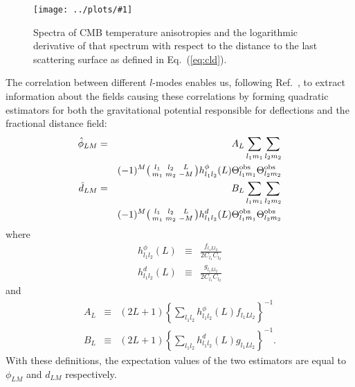 \documentclass[prl,amsmath,amssymb,floatfix,superscriptaddress,nofootinbib,twocolumn]{revtex4-1}
\def\bea{\begin{eqnarray}}
\def\eea{\end{eqnarray}}
\newcommand{\ec}[1]{Eq.~(\ref{eq:#1})}
\newcommand{\eql}[1]{\label{eq:#1}}
\newcommand{\sfig}[2]{
\texttt{[image: ../plots/\#1]}
        }
\newcommand{\Sfig}[2]{
   \begin{figure}[thbp]
   \begin{center}
    \sfig{#1.pdf}{\columnwidth}
    \caption{{\small #2}}
    \label{fig:#1}
     \end{center}
   \end{figure}
}
\newcommand{\scott}[1]{{\color{darkgreen} #1}}
\newcommand{\peikai}[1]{{\color{blue} #1}}
\newcommand{\wh}[1]{{\color{red} #1}}
\begin{document}
\Sfig{TT1}{Spectra of CMB temperature anisotropies and the logarithmic derivative of that spectrum with respect to the distance to the last scattering surface as defined in \ec{cld}.}


The correlation between different $l$-modes enables us, following Ref.~\cite{Okamoto:2003zw}, to extract information about the fields causing these correlations by forming quadratic estimators for both the gravitational potential responsible for deflections and the fractional distance field:
\bea
\hat \phi_{LM} &=& A_L 
\sum_{l_1m_1}\sum_{l_2m_2} \nonumber \\  
&& (-1)^M  \bigl(\begin{smallmatrix} l_1 & l_2 & L \\ m_1 & m_2 & -M  \end{smallmatrix}\bigr) h^{\phi}_{l_1l_2}(L)  \tob_{l_1m_1} \tob_{l_2m_2} \\
\hat d_{LM} &=& B_{L} \sum_{l_1m_1}\sum_{l_2m_2}\nonumber \\
&& (-1)^M  \bigl(\begin{smallmatrix} l_1 & l_2 & L \\ m_1 & m_2 & -M  \end{smallmatrix}\bigr) h^{d}_{l_1l_2}(L)  \tob_{l_1m_1} \tob_{l_2m_2}\eql{distest}
\eea
where
\bea
h^{\phi}_{l_1l_2}(L)&\equiv& \frac{f_{l_1Ll_2}}{2C_{l_1}C_{l_2}} \\
h^{d}_{l_1l_2}(L)&\equiv& \frac{g_{l_1Ll_2}}{2C_{l_1}C_{l_2}}
\eea
and %
\bea
A_L &\equiv& 
(2L+1)
 \left\{ \sum_{l_1l_2} h^{\phi}_{l_1l_2}(L)f_{l_1Ll_2}\right\}^{-1}\\
B_L &\equiv& (2L+1) \left\{ \sum_{l_1l_2} h^{d}_{l_1l_2}(L)g_{l_1Ll_2}\right\}^{-1}.\eql{bt}
\eea 
With these definitions, the expectation values of the two estimators are equal to $\phi_{LM}$ and $d_{LM}$ respectively.
\end{document}
